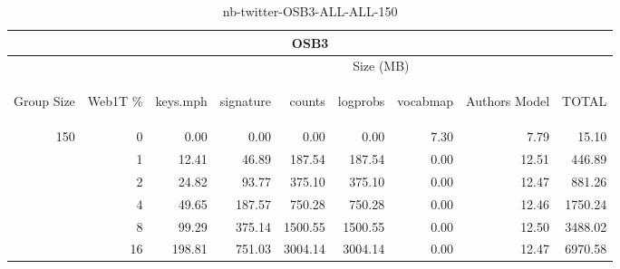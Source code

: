 \begin{center}
\begin{table}[htbp]
\begin{tabular}{ | r | r | r | r | r | r | r | r | r |}
\hline
\multicolumn{9}{|c|}{OSB3}\\
\hline
 & & \multicolumn{7}{|c|}{Size (MB)}\\ \cline{3-9}
\begin{sideways}Group Size\end{sideways} & \begin{sideways}Web1T \% \end{sideways} & \begin{sideways}keys.mph\end{sideways} & \begin{sideways}signature\end{sideways} & \begin{sideways}counts\end{sideways} & \begin{sideways}logprobs\end{sideways} & \begin{sideways}vocabmap\end{sideways} & \begin{sideways}Authors Model \end{sideways} & \begin{sideways}TOTAL\end{sideways}\\
\hline
\multirow{5}{*}{150}
 & 0 & 0.00 & 0.00 & 0.00 & 0.00 & 7.30 & 7.79 & 15.10\\ \cline{2-9}
 & 1 & 12.41 & 46.89 & 187.54 & 187.54 & 0.00 & 12.51 & 446.89\\ \cline{2-9}
 & 2 & 24.82 & 93.77 & 375.10 & 375.10 & 0.00 & 12.47 & 881.26\\ \cline{2-9}
 & 4 & 49.65 & 187.57 & 750.28 & 750.28 & 0.00 & 12.46 & 1750.24\\ \cline{2-9}
 & 8 & 99.29 & 375.14 & 1500.55 & 1500.55 & 0.00 & 12.50 & 3488.02\\ \cline{2-9}
 & 16 & 198.81 & 751.03 & 3004.14 & 3004.14 & 0.00 & 12.47 & 6970.58\\ \cline{2-9}
\hline
\end{tabular}
\caption{nb-twitter-OSB3-ALL-ALL-150}
\label{table:nb-twitter-OSB3-ALL-ALL-150}
\end{table}
\end{center}

